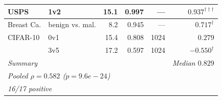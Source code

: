 \begin{table}[t]
\begin{tabular}{llrrrr}
    \midrule
    USPS         & 1v2            & 15.1 & 0.997 &   --- & $0.937^{{\dagger\dagger\dagger}}$ \\
    \midrule
    Breast Ca.   & benign vs. mal. & 8.2 & 0.945 &   --- & $0.717^{{\dagger}}$ \\
    \midrule
    CIFAR-10     & 0v1            & 15.4 & 0.808 &  1024 & $0.279$ \\
                 & 3v5            & 17.2 & 0.597 &  1024 & $-0.550^{{\dagger}}$ \\
    \midrule
    \multicolumn{5}{l}{\textit{Summary}} & \textit{Median $0.829$} \\
    \multicolumn{5}{l}{\textit{Pooled $\rho = 0.582$ ($p=9.6e-24$)}} \\
    \multicolumn{5}{l}{\textit{16/17 positive}} \\
    \bottomrule
  \end{tabular}
\end{table}

